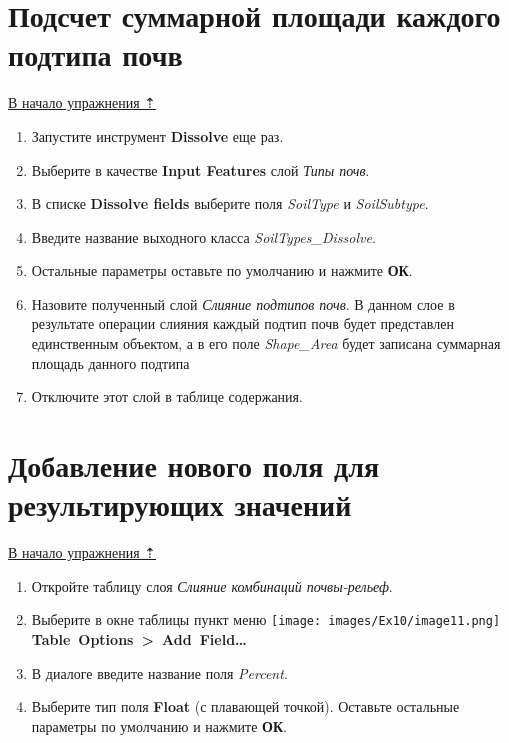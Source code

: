 \documentclass[12pt,]{book}
\begin{document}
\hypertarget{overlay-sumarea-subtypes}{%
\section{Подсчет суммарной площади каждого подтипа почв}\label{overlay-sumarea-subtypes}}

\protect\hyperlink{overlay}{В начало упражнения ⇡}

\begin{enumerate}
\def\labelenumi{\arabic{enumi}.}
\item
  Запустите инструмент \textbf{Dissolve} еще раз.
\item
  Выберите в качестве \textbf{Input Features} слой \emph{Типы почв}.
\item
  В списке \textbf{Dissolve fields} выберите поля \emph{SoilType} и \emph{SoilSubtype}.
\item
  Введите название выходного класса \emph{SoilTypes\_Dissolve}.
\item
  Остальные параметры оставьте по умолчанию и нажмите \textbf{ОК}.
\item
  Назовите полученный слой \emph{Слияние подтипов почв}. В данном слое в результате операции слияния каждый подтип почв будет представлен единственным объектом, а в его поле \emph{Shape\_Area} будет записана суммарная площадь данного подтипа
\item
  Отключите этот слой в таблице содержания.
\end{enumerate}

\hypertarget{overlay-field}{%
\section{Добавление нового поля для результирующих значений}\label{overlay-field}}

\protect\hyperlink{overlay}{В начало упражнения ⇡}

\begin{enumerate}
\def\labelenumi{\arabic{enumi}.}
\item
  Откройте таблицу слоя \emph{Слияние комбинаций почвы-рельеф}.
\item
  Выберите в окне таблицы пункт меню \texttt{[image: images/Ex10/image11.png]} \textbf{Table~Options~\textgreater~Add~Field\ldots{}}
\item
  В диалоге введите название поля \emph{Percent}.
\item
  Выберите тип поля \textbf{Float} (с плавающей точкой). Оставьте остальные параметры по умолчанию и нажмите \textbf{ОК}.
\end{enumerate}
\end{document}
